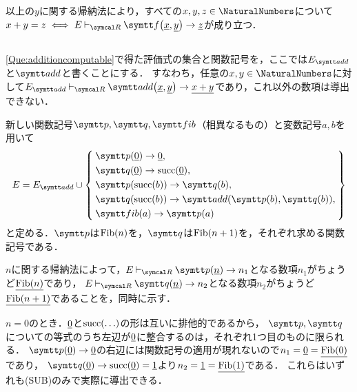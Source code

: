 以上の\(y\)に関する帰納法により，すべての\(x, y, z \in \NaturalNumbers\)について
\(x + y = z \metaequivalent E \evaluatable \apply{\obj{f}}{\numeral{x}, \numeral{y}} \evaluate \numeral{z}\)が成り立つ．

\subsection*{}

\cref{Que:additioncomputable}で得た評価式の集合と関数記号を，ここでは\(E_{\obj{add}}\)と\(\obj{add}\)と書くことにする．
すなわち，任意の\(x, y \in \NaturalNumbers\)に対して\(E_{\obj{add}} \evaluatable \apply{\obj{add}}{\numeral{x}, \numeral{y}} \evaluate \numeral{x + y}\)であり，これ以外の数項は導出できない．

新しい関数記号\(\obj{p}, \obj{q}, \obj{fib}\)（相異なるもの）と変数記号\(a, b\)を用いて
\begin{align*}
	E = E_{\obj{add}} \cup \Set{
		\begin{aligned}
			 & \apply{\obj{p}}{\numeral{0}} \evaluate \numeral{0},                                                        \\
			 & \apply{\obj{q}}{\numeral{0}} \evaluate \apply{\succfunc}{\numeral{0}},                                     \\
			 & \apply{\obj{p}}{\apply{\succfunc}{b}} \evaluate \apply{\obj{q}}{b},                                        \\
			 & \apply{\obj{q}}{\apply{\succfunc}{b}} \evaluate \apply{\obj{add}}{\apply{\obj{p}}{b}, \apply{\obj{q}}{b}}, \\
			 & \apply{\obj{fib}}{a} \evaluate \apply{\obj{p}}{a}
		\end{aligned}
	}
\end{align*}
と定める．\(\obj{p}\)は\(\apply{\Fib}{n}\)を，\(\obj{q}\)は\(\apply{\Fib}{n+1}\)を，それぞれ求める関数記号である．

\(n\)に関する帰納法によって，\(E \evaluatable \apply{\obj{p}}{\numeral{n}} \evaluate n_1\)となる数項\(n_1\)がちょうど\(\numeral{\apply{\Fib}{n}}\)であり，
\(E \evaluatable \apply{\obj{q}}{\numeral{n}} \evaluate n_2\)となる数項\(n_2\)がちょうど\(\numeral{\apply{\Fib}{n+1}}\)であることを，同時に示す．

\(n = 0\)のとき．\(\underline{0}\)と\(\apply{\succfunc}{\dots}\)の形は互いに排他的であるから，
\(\obj{p}, \obj{q}\)についての等式のうち左辺が\(\underline{0}\)に整合するのは，それぞれ1つ目のものに限られる．
\(\apply{\obj{p}}{\numeral{0}} \evaluate \numeral{0}\)の右辺には関数記号の適用が現れないので\(n_1 = \numeral{0} = \numeral{\apply{\Fib}{0}}\)であり，
\(\apply{\obj{q}}{\numeral{0}} \evaluate \apply{\succfunc}{\numeral{0}} = \numeral{1}\)より\(n_2 = \numeral{1} = \numeral{\apply{\Fib}{1}}\)である．
これらはいずれも(SUB)のみで実際に導出できる．

